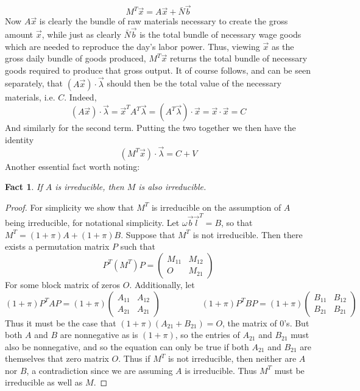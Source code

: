 \documentclass{article}
\theoremstyle{definition}
\theoremstyle{plain}
\theoremstyle{theorem}
\newtheorem{fact}{Fact}[section]
\begin{document}
\[  M^T\vec{x} = A\vec{x} + \bar{N}\vec{b} \]
Now $A\vec{x}$ is clearly the bundle of raw materials necessary to create the gross amount $\vec{x}$, while just as clearly $\bar{N}\vec{b}$ is the total bundle of necessary wage goods which are needed to reproduce the day's labor power. Thus, viewing $\vec{x}$ as the gross daily bundle of goods produced, $M^T\vec{x}$ returns the total bundle of necessary goods required to produce that gross output. It of course follows, and can be seen separately, that $(A\vec{x})\cdot\vec{\lambda}$ should then be the total value of the necessary materials, i.e. $C$. Indeed,
\[ (A\vec{x})\cdot\vec{\lambda} = \vec{x}^TA^T\vec{\lambda} = (A^T\vec{\lambda})\cdot\vec{x} = \vec{x} \cdot \vec{x} = C \]
And similarly for the second term. Putting the two together we then have the identity
\[ (M^T\vec{x})\cdot\vec{\lambda} = C+V \]
Another essential fact worth noting:
\begin{fact}
	If $A$ is irreducible, then $M$ is also irreducible. 
\end{fact}
\begin{proof}
	For simplicity we show that $M^T$ is irreducible on the assumption of $A$ being irreducible, for notational simplicity. Let $\omega\vec{b}\vec{l}^T = B$, so that $M^T = (1+\pi)A+(1+\pi)B$. Suppose that $M^T$ is not irreducible. Then there exists a permutation matrix $P$ such that
	\[ P^T(M^T)P = \begin{pmatrix} M_{11} & M_{12} \\ O & M_{21} \end{pmatrix} \]
For some block matrix of zeros $O$. Additionally, let
\[ (1+\pi)P^TAP = (1+\pi)\begin{pmatrix} A_{11} & A_{12} \\ A_{21} & A_{21} \end{pmatrix} \hspace{2cm} (1+\pi)P^TBP = (1+\pi)\begin{pmatrix} B_{11} & B_{12} \\ B_{21} & B_{21} \end{pmatrix} \]
Thus it must be the case that $(1+\pi)(A_{21} + B_{21}) = O$, the matrix of $0$'s. But both $A$ and $B$ are nonnegative as is $(1+\pi)$, so the entries of $A_{21}$ and $B_{21}$ must also be nonnegative, and so the equation can only be true if both $A_{21}$ and $B_{21}$ are themselves that zero matrix $O$. Thus if $M^T$ is not irreducible, then neither are $A$ nor $B$, a contradiction since we are assuming $A$ is irreducible. Thus $M^T$ must be irreducible as well as $M$. 
\end{proof}
\end{document}
